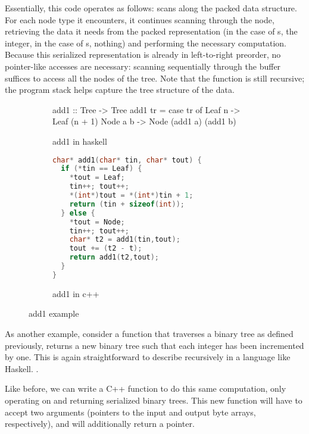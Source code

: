 Essentially, this code operates as follows:  scans along the packed
data structure. For each node type it encounters, it continues scanning
through the node, retrieving the data it needs from the packed representation
(in the case of s, the integer, in the case of s,
nothing) and performing the necessary computation. Because this serialized
representation is already in left-to-right preorder, no pointer-like
accesses are necessary: scanning sequentially through the buffer suffices to
access all the nodes of the tree. Note that the  function is
still recursive; the program stack helps capture the tree structure of the
data.

\begin{figure}
  \begin{subfigure}{\textwidth}
\begin{code}
add1 :: Tree -> Tree
add1 tr =
  case tr of
    Leaf n -> Leaf (n + 1)
    Node a b -> Node (add1 a) (add1 b)
\end{code}
    \caption{add1 in haskell}\label{fig:add1-haskell}
  \end{subfigure}

  \begin{subfigure}{\textwidth}
\begin{lstlisting}[language=C++]
char* add1(char* tin, char* tout) {
  if (*tin == Leaf) {
    *tout = Leaf;
    tin++; tout++;
    *(int*)tout = *(int*)tin + 1;
    return (tin + sizeof(int));
  } else {
    *tout = Node;
    tin++; tout++;
    char* t2 = add1(tin,tout);
    tout += (t2 - t);
    return add1(t2,tout);
  }
}
\end{lstlisting}
    \caption{add1 in c++}\label{fig:add1-cpp}
  \end{subfigure}
\caption{add1 example}
\end{figure}

As another example, consider a function that traverses a binary tree as defined
previously, returns a new binary tree such that each integer has been incremented
by one. This is again straightforward to describe recursively in a language
like Haskell. .

Like before, we can write a C++ function to do this same computation, only
operating on and returning serialized binary trees. This new function will
have to accept two arguments (pointers to the input and output byte arrays,
respectively), and will additionally return a pointer. 


